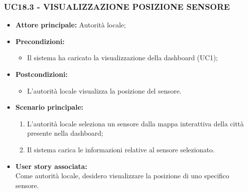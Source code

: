 \subsubsection{UC18.3 - VISUALIZZAZIONE POSIZIONE SENSORE}
\begin{itemize}
    \item \textbf{Attore principale:} Autorità locale;
    \item \textbf{Precondizioni:}
        \begin{itemize}
            \item Il sistema ha caricato la visualizzazione della dashboard (UC1);
        \end{itemize}
    \item \textbf{Postcondizioni:}
        \begin{itemize}
            \item L'autorità locale visualizza la posizione del sensore.
        \end{itemize}
    \item \textbf{Scenario principale:}
        \begin{enumerate}
            \item L'autorità locale seleziona un sensore dalla mappa interattiva della città presente nella dashboard;
            \item Il sistema carica le informazioni relative al sensore selezionato.
        \end{enumerate}
    \item \textbf{User story associata:} \\
        Come autorità locale, desidero visualizzare la posizione di uno specifico sensore.
\end{itemize}